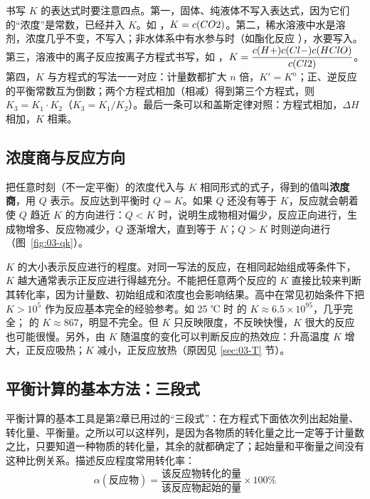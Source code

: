书写 $K$ 的表达式时要注意四点。第一，固体、纯液体不写入表达式，因为它们的“浓度”是常数，已经并入 $K$。如 ，$K=c(CO2)$。第二，稀水溶液中水是溶剂，浓度几乎不变，不写入；非水体系中有水参与时（如酯化反应 ），水要写入。第三，溶液中的离子反应按离子方程式书写，如 ，$K=\dfrac{c(H+)c(Cl-)c(HClO)}{c(Cl2)}$。第四，$K$ 与方程式的写法一一对应：计量数都扩大 $n$ 倍，$K'=K^n$；正、逆反应的平衡常数互为倒数；两个方程式相加（相减）得到第三个方程式，则 $K_3=K_1\cdot K_2$（$K_3=K_1/K_2$）。最后一条可以和盖斯定律对照：方程式相加，$\Delta H$ 相加，$K$ 相乘。

\subsection{浓度商与反应方向}
把任意时刻（不一定平衡）的浓度代入与 $K$ 相同形式的式子，得到的值叫\textbf{浓度商}，用 $Q$ 表示。反应达到平衡时 $Q=K$。如果 $Q$ 还没有等于 $K$，反应就会朝着使 $Q$ 趋近 $K$ 的方向进行：$Q<K$ 时，说明生成物相对偏少，反应正向进行，生成物增多、反应物减少，$Q$ 逐渐增大，直到等于 $K$；$Q>K$ 时则逆向进行（图~\ref{fig:03-qk}）。


$K$ 的大小表示反应进行的程度。对同一写法的反应，在相同起始组成等条件下，$K$ 越大通常表示正反应进行得越充分。不能把任意两个反应的 $K$ 直接比较来判断其转化率，因为计量数、初始组成和浓度也会影响结果。高中在常见初始条件下把 $K>10^5$ 作为反应基本完全的经验参考。如 25 ℃ 时  的 $K\approx6.5\times10^{95}$，几乎完全； 的 $K\approx867$，明显不完全。但 $K$ 只反映限度，不反映快慢，$K$ 很大的反应也可能很慢。另外，由 $K$ 随温度的变化可以判断反应的热效应：升高温度 $K$ 增大，正反应吸热；$K$ 减小，正反应放热（原因见 \ref{sec:03-T} 节）。

\subsection{平衡计算的基本方法：三段式}
平衡计算的基本工具是第2章已用过的“三段式”：在方程式下面依次列出起始量、转化量、平衡量。之所以可以这样列，是因为各物质的转化量之比一定等于计量数之比，只要知道一种物质的转化量，其余的就都确定了；起始量和平衡量之间没有这种比例关系。描述反应程度常用转化率：
\[\alpha(\text{反应物})=\frac{\text{该反应物转化的量}}{\text{该反应物起始的量}}\times100\%\]

